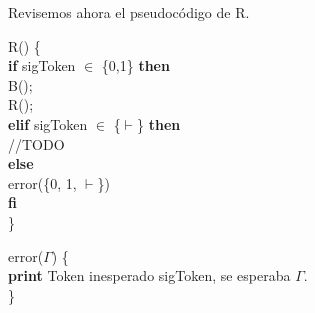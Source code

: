 \documentclass[\main/ApuntesPL.tex]{subfiles}
\begin{document}
    \bigskip
    \par
    Revisemos ahora el pseudocódigo de R.
    \begin{center}
      \begin{minipage}{.4\textwidth}
        R() \{\\
        \hspace*{5mm}\textbf{if} sigToken $\in$ \{0,1\} \textbf{then}\\
        \hspace*{10mm}B();\\
        \hspace*{10mm}R();\\
        \hspace*{5mm}\textbf{elif} sigToken $\in$ \{$\vdash$\} \textbf{then}\\
        \hspace*{10mm}//TODO\\
        \hspace*{5mm}\textbf{else}\\
        \hspace*{10mm}error(\{0, 1, $\vdash$\})\\
        \hspace*{5mm}\textbf{fi}\\
        \}
      \end{minipage}%
      \begin{minipage}{.6\textwidth}
        error($\Gamma$) \{\\
        \hspace*{5mm}\textbf{print} Token inesperado sigToken, se esperaba $\Gamma$.\\
        \}
      \end{minipage}
    \end{center}
\end{document}
